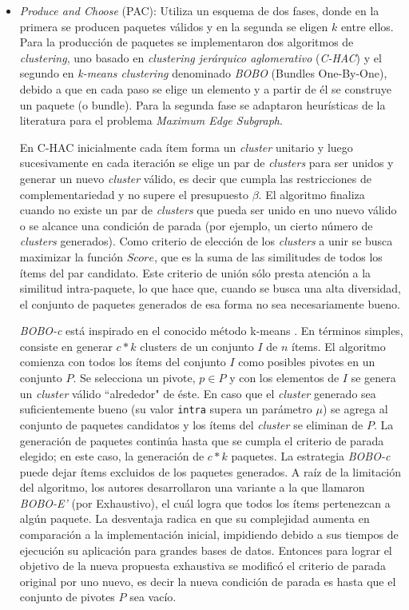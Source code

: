\begin{itemize}

	\item {\em Produce and Choose} (PAC): Utiliza un esquema de dos fases, donde en la primera se producen paquetes válidos y en la segunda se eligen $k$ entre ellos. Para la producción de paquetes se implementaron dos algoritmos de {\em clustering}, uno basado en {\em clustering jerárquico aglomerativo} (\textit{C-HAC}) y el segundo en {\em k-means clustering} denominado \textit{BOBO} (Bundles One-By-One), debido a que en cada paso se elige un elemento y a partir de él se construye un paquete (o bundle). Para la segunda fase se adaptaron heurísticas de la literatura para el problema {\em Maximum Edge Subgraph}.

En C-HAC inicialmente cada ítem forma un {\em cluster} unitario y luego sucesivamente en cada iteración se elige un par de {\em clusters} para ser unidos y generar un nuevo {\em cluster} válido, es decir que cumpla las restricciones de complementariedad y no supere el presupuesto $\beta$. El algoritmo finaliza cuando no existe un par de {\em clusters} que pueda ser unido en uno nuevo válido o se alcance una condición de parada (por ejemplo, un cierto número de {\em clusters} generados). Como criterio de elección de los {\em clusters} a unir se busca maximizar la función $Score$, que es la suma de las similitudes de todos los ítems del par candidato. Este criterio de unión sólo presta atención a la similitud intra-paquete, lo que hace que, cuando se busca una alta diversidad, el conjunto de paquetes generados de esa forma no sea necesariamente bueno.

{\em BOBO-c} está inspirado en el conocido método k-means \cite{forgy65}. En términos simples, consiste en generar $c*k$ clusters de un conjunto $I$ de $n$ ítems. El algoritmo comienza con todos los ítems del conjunto $I$ como posibles pivotes en un conjunto $P$. Se selecciona un pivote, $p \in P$ y con los elementos de $I$ se genera un {\em cluster} válido ``alrededor" de éste. En caso que el {\em cluster} generado sea suficientemente bueno (su valor \texttt{intra} supera un parámetro $\mu$) se agrega al conjunto de paquetes candidatos y los ítems del {\em cluster} se eliminan de $P$. La generación de paquetes continúa hasta que se cumpla el criterio de parada elegido; en este caso, la generación de $c*k$ paquetes. La estrategia \textit{BOBO-c} puede dejar ítems excluidos de los paquetes generados. A raíz de la limitación del algoritmo, los autores desarrollaron una variante a la que llamaron \textit{BOBO-E'} (por Exhaustivo), el cuál logra que todos los ítems pertenezcan a algún paquete. La desventaja radica en que su complejidad aumenta en comparación a la implementación inicial, impidiendo debido a sus tiempos de ejecución su aplicación para grandes bases de datos. Entonces para lograr el objetivo de la nueva propuesta exhaustiva se modificó el criterio de parada original por uno nuevo, es decir la nueva condición de parada es hasta que el conjunto de pivotes $P$ sea vacío.


\end{itemize}
